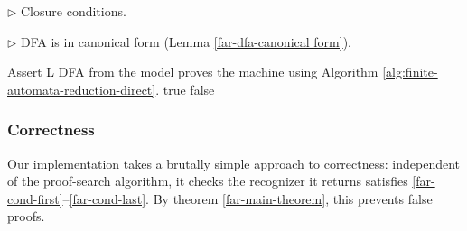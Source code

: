 \begin{algorithm}
\begin{algorithmic}[1]
        \State \(\triangleright\) Closure conditions.
        \State{}
        \EndFor
        \State{}
        \EndFor
        \State{}
        \EndFor

        \State \(\triangleright\) DFA is in canonical form (Lemma \ref{far-dfa-canonical form}).
        \State{}
        \State{}
        \State{}
        \EndFor
        \EndFor

        \State Assert L DFA from the model proves the machine using Algorithm \ref{alg:finite-automata-reduction-direct}.
        \State \Return true
        \Else\;\Return false
        \EndIf
        \EndProcedure
    \end{algorithmic}
\end{algorithm}


\subsubsection{Correctness}
Our implementation takes a brutally simple approach to correctness:
independent of the proof-search algorithm, it checks the recognizer it returns satisfies \eqref{far-cond-first}--\eqref{far-cond-last}.
By theorem \ref{far-main-theorem}, this prevents false proofs.



